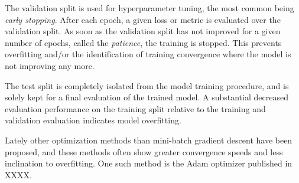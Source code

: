 The validation split is used for hyperparameter tuning, the most common being \textit{early stopping}.
After each epoch, a given loss or metric is evaluated over the validation split.
As soon as the validation split has not improved for a given number of epochs, called the \textit{patience}, the training is stopped.
This prevents overfitting and/or the identification of training convergence where the model is not improving any more.

The test split is completely isolated from the model training procedure, and is solely kept for a final evaluation of the trained model.
A substantial decreased evaluation performance on the training split relative to the training and validation evaluation indicates model overfitting.

Lately other optimization methods than mini-batch gradient descent have been proposed, and these methods often show greater convergence speeds and less inclination to overfitting.
One such method is the Adam optimizer published in XXXX.
